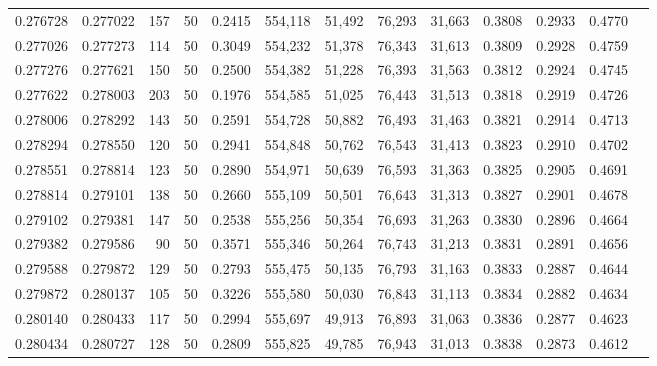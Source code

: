 \begin{tabular}{rrrrrrrrrrrrr}
0.276728 & 0.277022 &   157 &  50 &                                     0.2415 & 554,118 &  51,492 &  76,293 &  31,663 & 0.3808 & 0.2933 & 0.4770 \\
0.277026 & 0.277273 &   114 &  50 &                                     0.3049 & 554,232 &  51,378 &  76,343 &  31,613 & 0.3809 & 0.2928 & 0.4759 \\
0.277276 & 0.277621 &   150 &  50 &                                     0.2500 & 554,382 &  51,228 &  76,393 &  31,563 & 0.3812 & 0.2924 & 0.4745 \\
0.277622 & 0.278003 &   203 &  50 &                                     0.1976 & 554,585 &  51,025 &  76,443 &  31,513 & 0.3818 & 0.2919 & 0.4726 \\
0.278006 & 0.278292 &   143 &  50 &                                     0.2591 & 554,728 &  50,882 &  76,493 &  31,463 & 0.3821 & 0.2914 & 0.4713 \\
0.278294 & 0.278550 &   120 &  50 &                                     0.2941 & 554,848 &  50,762 &  76,543 &  31,413 & 0.3823 & 0.2910 & 0.4702 \\
0.278551 & 0.278814 &   123 &  50 &                                     0.2890 & 554,971 &  50,639 &  76,593 &  31,363 & 0.3825 & 0.2905 & 0.4691 \\
0.278814 & 0.279101 &   138 &  50 &                                     0.2660 & 555,109 &  50,501 &  76,643 &  31,313 & 0.3827 & 0.2901 & 0.4678 \\
0.279102 & 0.279381 &   147 &  50 &                                     0.2538 & 555,256 &  50,354 &  76,693 &  31,263 & 0.3830 & 0.2896 & 0.4664 \\
0.279382 & 0.279586 &    90 &  50 &                                     0.3571 & 555,346 &  50,264 &  76,743 &  31,213 & 0.3831 & 0.2891 & 0.4656 \\
0.279588 & 0.279872 &   129 &  50 &                                     0.2793 & 555,475 &  50,135 &  76,793 &  31,163 & 0.3833 & 0.2887 & 0.4644 \\
0.279872 & 0.280137 &   105 &  50 &                                     0.3226 & 555,580 &  50,030 &  76,843 &  31,113 & 0.3834 & 0.2882 & 0.4634 \\
0.280140 & 0.280433 &   117 &  50 &                                     0.2994 & 555,697 &  49,913 &  76,893 &  31,063 & 0.3836 & 0.2877 & 0.4623 \\
0.280434 & 0.280727 &   128 &  50 &                                     0.2809 & 555,825 &  49,785 &  76,943 &  31,013 & 0.3838 & 0.2873 & 0.4612 \\

\end{tabular}
